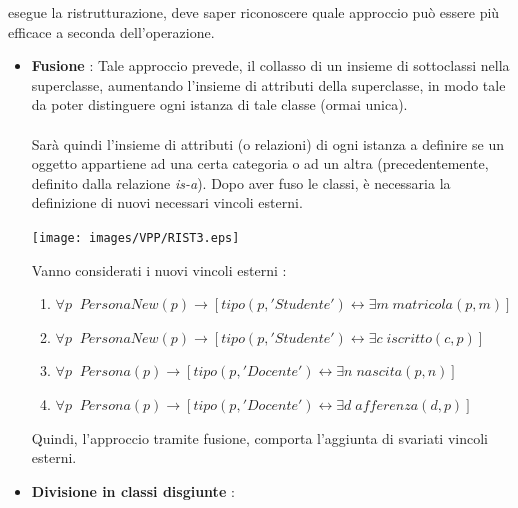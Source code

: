 \documentclass[12pt, letterpaper]{article}
\newcommand{\acc}{\\\hphantom{}\\}
\begin{document}
esegue la ristrutturazione, deve saper riconoscere quale approccio può essere più efficace a seconda dell'operazione.\begin{itemize}
    \item \textbf{Fusione} : Tale approccio prevede, il collasso di un insieme di sottoclassi nella superclasse,
    aumentando l'insieme di attributi della superclasse, in modo tale da poter distinguere ogni istanza di tale 
    classe (ormai unica).\acc Sarà quindi l'insieme di attributi (o relazioni) di ogni istanza a definire se un oggetto 
    appartiene ad una certa categoria o ad un altra (precedentemente, definito dalla relazione \textit{is-a}). Dopo aver 
    fuso le classi, è necessaria la definizione di nuovi necessari vincoli esterni.\begin{center}
        \texttt{[image: images/VPP/RIST3.eps]}
    \end{center}
    Vanno considerati i nuovi vincoli esterni : \begin{enumerate}
        \item $\forall p\;\;PersonaNew(p)\rightarrow[tipo(p, 'Studente') \leftrightarrow \exists m\;  matricola(p, m)]$
        \item $\forall p\;\; PersonaNew(p)\rightarrow [tipo(p, 'Studente') \leftrightarrow \exists c\; iscritto(c, p)]$
        \item $\forall p\;\; Persona(p) \rightarrow [tipo(p, 'Docente') \leftrightarrow \exists n\; nascita(p, n)]$
        \item $\forall p\;\; Persona(p) \rightarrow [tipo(p, 'Docente') \leftrightarrow \exists d \;afferenza(d, p)]$
    \end{enumerate}
    Quindi, l'approccio tramite fusione, comporta l'aggiunta di svariati vincoli esterni.
    \item \textbf{Divisione in classi disgiunte} : 
\end{itemize}
\end{document}
